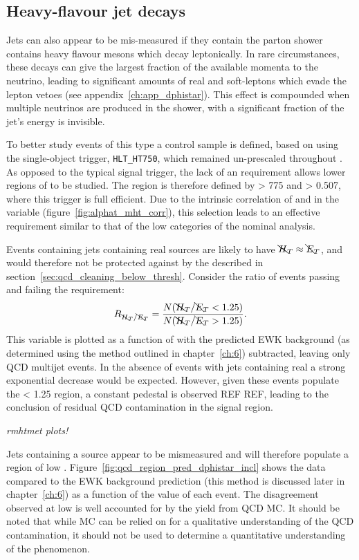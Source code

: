 \subsection{Heavy-flavour jet decays}

Jets can also appear to be mis-measured if they contain the parton
shower contains heavy flavour mesons which decay leptonically. In rare
circumstances, these decays can give the largest fraction of the available
momenta to the neutrino, leading to significant amounts of real \met and
soft-leptons which evade the lepton vetoes (see appendix~\ref{ch:app_dphistar}).
This effect is compounded when multiple neutrinos are produced in the shower,
with a significant fraction of the jet's energy is invisible.

To better study events of this type a control sample is defined, based on using
the single-object \HT trigger, \verb!HLT_HT750!, which remained un-prescaled
throughout \runone. As opposed to the typical signal trigger, the lack of an
\alphat requirement allows lower regions of \alphat to be studied. The region is
therefore defined by \HT > 775 \gev and \alphat > 0.507, where this trigger is
full efficient. Due to the intrinsic correlation of \HT and \mht in the \alphat
variable (figure~\ref{fig:alphat_mht_corr}), this selection leads to an
effective \mht requirement similar to that of the low \HT categories of the
nominal analysis.

Events containing jets containing real \met sources are likely to have
$\bcancel{H}_T \approx \bcancel{E}_T$, and would therefore not be protected against by the \mhtmet
described in section~\ref{sec:qcd_cleaning_below_thresh}. Consider the ratio
of events passing and failing the \mhtmet requirement:
% 
\begin{equation}
\label{eq:rmhtmet}
R_{\bcancel{H}_T / \bcancel{E}_T} = \frac{N(\bcancel{H}_T / \bcancel{E}_T<1.25)}{N(\bcancel{H}_T / \bcancel{E}_T>1.25)}.
\end{equation}
% 
This variable is plotted as a function of \alphat with the predicted EWK
background (as determined using the method outlined in chapter~\ref{ch:6})
subtracted, leaving only QCD multijet events.
In the absence of events with jets containing real \met a strong
exponential decrease would be expected. However, given these events populate the
\mhtmet < 1.25 region, a constant pedestal is observed REF REF, leading to the
conclusion of residual QCD contamination in the signal region.

\emph{rmhtmet plots!}

Jets containing a \met source appear to be mismeasured and will therefore
populate a region of low \dphistar.
Figure~\ref{fig:qcd_region_pred_dphistar_incl} shows the data compared to the
EWK background prediction (this method is discussed later in chapter~\ref{ch:6})
as a function of the \mindphistar value of each event. The disagreement observed
at low \mindphistar is well accounted for by the yield from QCD MC. It should be
noted that while MC can be relied on for a qualitative understanding of the QCD
contamination, it should not be used to determine a quantitative understanding
of the phenomenon.

